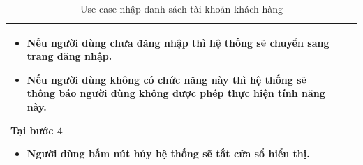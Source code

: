 \documentclass[12pt,a4paper]{article}
\begin{document}
\begin{table}[H]
\begin{tabular}{|p{3.5cm}|p{11.5cm}|c|}
\begin{itemize}
                              \item Nếu người dùng chưa đăng nhập thì hệ thống sẽ chuyển sang trang đăng nhập.
                              \item Nếu người dùng không có chức năng này thì hệ thống sẽ thông báo người dùng không được phép thực hiện tính năng này.
            \end{itemize}
            Tại bước 4\newline
            \vspace{-.8cm}\begin{itemize}
                              \item Người dùng bấm nút hủy hệ thống sẽ tắt cửa sổ hiển thị.
            \end{itemize}
            \\ \hline
        \end{tabular}
        \caption{Use case nhập danh sách tài khoản khách hàng}
    \end{table}


\end{document}
